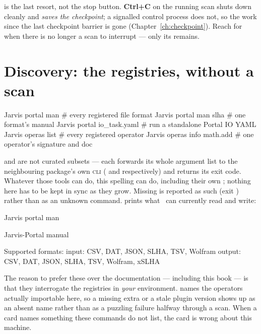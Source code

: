 \begin{jwarn}
 is the last resort, not the stop button. \textbf{Ctrl+C} on the running scan
shuts down cleanly and \emph{saves the checkpoint}; a signalled control process does
not, so the work since the last checkpoint barrier is gone
(Chapter~\ref{ch:checkpoint}). Reach for  when there is no longer a scan to
interrupt --- only its remains.
\end{jwarn}

\section{Discovery: the registries, without a scan}
\label{sec:cli-discovery}

\begin{terminal}
\begin{jcmd}
Jarvis portal man             # every registered file format
Jarvis portal man slha        # one format's manual
Jarvis portal io_task.yaml    # run a standalone Portal IO YAML
Jarvis operas list            # every registered operator
Jarvis operas info math.add   # one operator's signature and doc
\end{jcmd}
\end{terminal}

 and  are not curated subsets --- each forwards its whole argument
list to the neighbouring package's own \textsc{cli} ( and 
respectively) and returns its exit code. Whatever those tools can do, this spelling can do,
including their own ; nothing here has to be kept in sync as they grow. Missing
 is reported as such (exit ) rather than as an unknown
command.  prints what \Portal\ can currently read and write:

\begin{terminal}
\begin{jcmd}
Jarvis portal man
\end{jcmd}
\termsep
\begin{jout}
Jarvis-Portal manual

Supported formats:
  input: CSV, DAT, JSON, SLHA, TSV, Wolfram
  output: CSV, DAT, JSON, SLHA, TSV, Wolfram, xSLHA
\end{jout}
\end{terminal}

The reason to prefer these over the documentation --- including this book --- is that
they interrogate the registries in \emph{your} environment.  names the
operators actually importable here, so a missing extra or a stale plugin version shows
up as an absent name rather than as a puzzling  failure halfway
through a scan. When a card names something these commands do not list, the card is
wrong about this machine.

